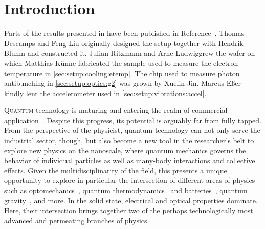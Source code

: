 \chapter{Introduction}\label{ch:setup:introduction}
\begin{partcontribs}
    Parts of the results presented in \thispart have been published in Reference~.
    Thomas Descamps and Feng Liu originally designed the setup together with Hendrik Bluhm and constructed it.
    Julian Ritzmann and Arne Ludwig\sidenotemark[a] grew the wafer on which Matthias Künne fabricated the sample used to measure the electron temperature in \cref{sec:setup:cooling:etemp}.
    The chip used to measure photon antibunching in \cref{sec:setup:optics:g2} was grown by Xuelin Jin.
    Marcus Eßer kindly lent the accelerometer used in \cref{sec:setup:vibrations:accel}.
\end{partcontribs}

\lettrine[lines=3,lhang=0.33,loversize=0.25,depth=1]{Q}{uantum} technology is maturing and entering the realm of commercial application~\cite{Schleich2016,Mohseni2017,QTBMBF,QTCEN,QTEU}.
Despite this progress, its potential is arguably far from fully tapped.
From the perspective of the physicist, quantum technology can not only serve the industrial sector, though, but also become a new tool in the researcher's belt to explore new physics on the nanoscale, where quantum mechanics governs the behavior of individual particles as well as many-body interactions and collective effects.
Given the multidisciplinarity of the field, this presents a unique opportunity to explore in particular the intersection of different areas of physics such as optomechanics~\cite{Aspelmeyer2014,Barzanjeh2022}, quantum thermodynamics~\cite{Goold2016,Deffner2019,Cangemi2024} and batteries~\cite{Campaioli2024}, quantum gravity~\cite{Degen2017,Bass2024}, and more.
In the solid state, electrical and optical properties dominate.
Here, their intersection brings together two of the perhaps technologically most advanced and permeating branches of physics.

